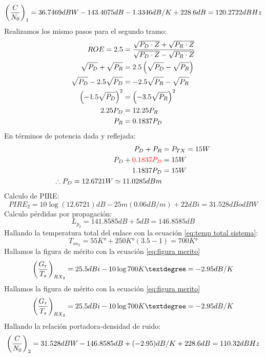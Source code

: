 \documentclass[
	12pt, %
	fleqn, %
	a4paper, %
	oneside, %
]{LegrandOrangeBook}
\begin{document}
\begin{example}
\begin{displaymath}
\left(\frac{C}{N_0}\right)_1=36.7469 dBW - 143.4075 dB-1.3346 dB/K+228.6 dB=120.2722 dBHz
\end{displaymath}
Realizamos los mismo pasos para el segundo tramo:
\begin{align*}
ROE=2.5&=\frac{\sqrt{P_D\cdot Z}+\sqrt{P_R\cdot Z}}{\sqrt{P_D\cdot Z}-\sqrt{P_R\cdot Z}}\\
\sqrt{P_D}+\sqrt{P_R}&=2.5\left(\sqrt{P_D}-\sqrt{P_R}\right)\\
\sqrt{P_D}-2.5\sqrt{P_D}&=-2.5\sqrt{P_R}-\sqrt{P_R}\\
\left(-1.5\sqrt{P_D}\right)^2&=\left(-3.5\sqrt{P_R}\right)^2\\
2.25P_D&=12.25P_R\\
P_R&=0.1837P_D
\end{align*}
En términos de potencia dada y reflejada:
\begin{align*}
P_D+P_R&=P_{TX}=15W\\
P_D+\textcolor{red}{0.1837P_D}&=15W\\
1.1837P_D&=15W\\
\therefore P_D=12.6721W\simeq 11.0285 dBm
\end{align*}
Calculo de PIRE:
\begin{displaymath}
PIRE_2=10\log(12.6721)dB-25m(0.06dB/m)+22dBi=31.528 dB o dBW
\end{displaymath}
Calculo pérdidas por propagación:
\begin{displaymath}
L_{p_2}=141.8585 dB+5 dB=146.8585 dB
\end{displaymath}
Hallando la temperatura total del enlace con la ecuación \ref{eq:temp total sistema}:
\begin{displaymath}
T_{sn_2}=55K°+250K°(3.5-1)=700 K°
\end{displaymath}
Hallamos la figura de mérito con la ecuación \ref{eq:figura merito}
\begin{displaymath}
\parentesis{\frac{G_r}{T_s}}_{RX_2}=25.5dBi-10\log 700K°=-2.95 dB/K
\end{displaymath}
Hallamos la figura de mérito con la ecuación \ref{eq:figura merito}
\begin{displaymath}
\parentesis{\frac{G_r}{T_s}}_{RX_2}=25.5dBi-10\log 700K°=-2.95 dB/K
\end{displaymath}
Hallando la relación portadora-densidad de ruido:
\begin{displaymath}
\left(\frac{C}{N_0}\right)_2=31.528 dBW - 146.8585 dB+(-2.95) dB/K+228.6 dB=110.32 dBHz
\end{displaymath}

\end{example}
\end{document}

